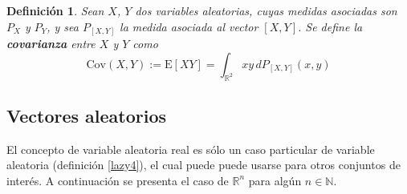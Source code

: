 \documentclass[12pt,letterpaper]{book}
\newtheorem{definicion}{Definición}[chapter]
\newtheorem{proposicion}[teorema]{Proposición}
\newcommand{\R}{\mathbb{R}}
\newcommand{\N}{\mathbb{N}}
\newcommand{\COS}[1]{\mathrm{cos}\left( #1 \right)}
\newcommand{\SEN}[1]{\mathrm{sen}\left( #1 \right)}
\newcommand{\E}[1]{\mathrm{E}\left[ #1 \right]}
\newcommand{\Var}[1]{\mathrm{Var}\left( #1 \right)}
\newcommand{\Cov}[1]{\mathrm{Cov}\left( #1 \right)}
\begin{document}


\begin{definicion}
Sean $X$, $Y$ dos variables aleatorias, cuyas medidas asociadas son $P_X$ y $P_Y$, y sea $P_{[X,Y]}$ la medida asociada al vector $[X,Y]$. Se define la \textbf{covarianza} entre $X$ y $Y$ como
\begin{equation}
\Cov{X,Y} := \E{X Y} = \int_{\R^{2}} x y\, d P_{[X,Y]}(x,y)
\end{equation}
\end{definicion}



\subsection{Vectores aleatorios}

El concepto de variable aleatoria real es sólo un caso particular de variable aleatoria (definición \ref{lazy4}), el cual puede puede usarse para otros conjuntos de interés.
%
A continuación se presenta el caso de $\R^{n}$ para algún $n\in \N$.
\end{document}
